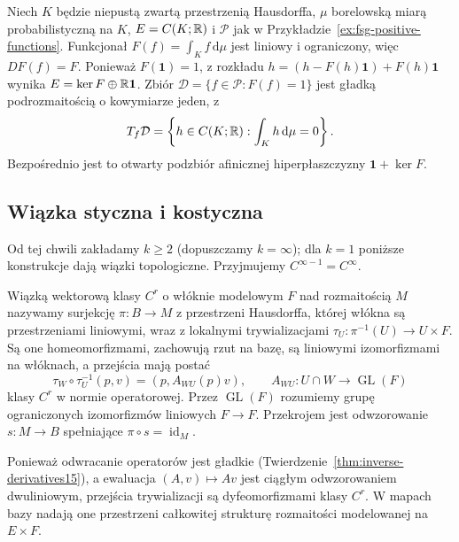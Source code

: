 \begin{przyklad}
\label{ex:fsg-normalized-positive}
Niech $K$ będzie niepustą zwartą przestrzenią Hausdorffa,
$\mu$ borelowską miarą probabilistyczną na $K$,
$E=C(K;\mathbb R)$ i $\mathcal P$ jak w
Przykładzie~\ref{ex:fsg-positive-functions}.
Funkcjonał $F(f)=\int_K f\,\mathrm d\mu$ jest liniowy
i ograniczony, więc $DF(f)=F$. Ponieważ $F(\mathbf 1)=1$,
z rozkładu $h=(h-F(h)\mathbf 1)+F(h)\mathbf 1$ wynika
$E=\ker F\oplus\mathbb R\mathbf 1$.
Zbiór $\mathcal D=\{f\in\mathcal P:F(f)=1\}$ jest
gładką podrozmaitością o kowymiarze jeden, z
\[
 T_f\mathcal D=\left\{h\in C(K;\mathbb R):
                  \int_K h\,\mathrm d\mu=0\right\}.
\]
Bezpośrednio jest to otwarty podzbiór afinicznej
hiperpłaszczyzny $\mathbf 1+\ker F$.
\end{przyklad}

\subsection{Wiązka styczna i kostyczna}

Od tej chwili zakładamy $k\ge2$ (dopuszczamy $k=\infty$);
dla $k=1$ poniższe konstrukcje dają wiązki topologiczne.
Przyjmujemy $C^{\infty-1}=C^\infty$.

\begin{definicja}
\label{def:fsg-vector-bundle}
Wiązką wektorową klasy $C^r$ o włóknie modelowym $F$
nad rozmaitością $M$ nazywamy surjekcję $\pi:B\to M$
z przestrzeni Hausdorffa, której włókna są przestrzeniami
liniowymi, wraz z lokalnymi trywializacjami
$\tau_U:\pi^{-1}(U)\to U\times F$. Są one homeomorfizmami,
zachowują rzut na bazę, są liniowymi izomorfizmami
na włóknach, a przejścia mają postać
\[
 \tau_W\circ\tau_U^{-1}(p,v)=(p,A_{WU}(p)v),
 \qquad A_{WU}:U\cap W\to \operatorname{GL}(F)
\]
klasy $C^r$ w normie operatorowej.
Przez $\operatorname{GL}(F)$ rozumiemy grupę
ograniczonych izomorfizmów liniowych $F\to F$.
Przekrojem jest odwzorowanie $s:M\to B$ spełniające
$\pi\circ s=\operatorname{id}_M$.
\end{definicja}
Ponieważ odwracanie operatorów jest gładkie
(Twierdzenie~\ref{thm:inverse-derivatives15}), a ewaluacja
$(A,v)\mapsto Av$ jest ciągłym odwzorowaniem dwuliniowym,
przejścia trywializacji są dyfeomorfizmami klasy $C^r$.
W mapach bazy nadają one przestrzeni całkowitej strukturę
rozmaitości modelowanej na $E\times F$.

